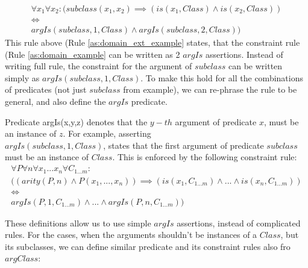 \begin{equation}\label{as:domain_ext_example}
\begin{gathered}
  \forall x_1 \forall x_2: (subclass(x_1,x_2) \implies (is(x_1,Class) \land is(x_2,Class)) \\ 
  \iff \\
  argIs(subclass,1,Class) \land argIs(subclass,2,Class))
\end{gathered}
\end{equation}
This rule above (Rule \ref{as:domain_ext_example} states, that the constraint
rule (Rule \ref{as:domain_example} can be written as 2 $argIs$ assertions.
Instead of writing full rule, the constraint for the argunent of $subclass$ can
be written simply as $argIs(subclass,1,Class)$. To make this hold for all the
combinations of predicates (not just $subclass$ from example), we can
re-phrase the rule to be general, and also define the $argIs$ predicate.

\begin{definition}\label{def:pred_argis}
Predicate argIs(x,y,z) denotes that the $y-th$ argument of predicate $x$, must
be an instance of $z$. For example, asserting \\$argIs(subclass,1, Class)$, states
that the first argument of predicate $subclass$ must be an instance of $Class$.
This is enforced by the following constraint rule:
\begin{equation}\label{as:domain_isa_constraint}
\begin{gathered}
  \forall P \forall n \forall x_1...x_n \forall C_{1...m}: \\
  ((arity(P,n) \land P(x_1,...,x_n)) \implies (is(x_1,C_{1...m}) \land ... \land is(x_n,C_{1...m})) \\ 
  \iff \\
  argIs(P,1,C_{1...m}) \land ... \land argIs(P,n,C_{1...m}))
\end{gathered}
\end{equation}
\end{definition}

These definitions allow us to use simple $argIs$ assertions, instead of
complicated rules. For the cases, when the arguments shouldn't be instances
of a $Class$, but its subclasses, we can define similar predicate and its
constraint rules also fro $argClass$:

